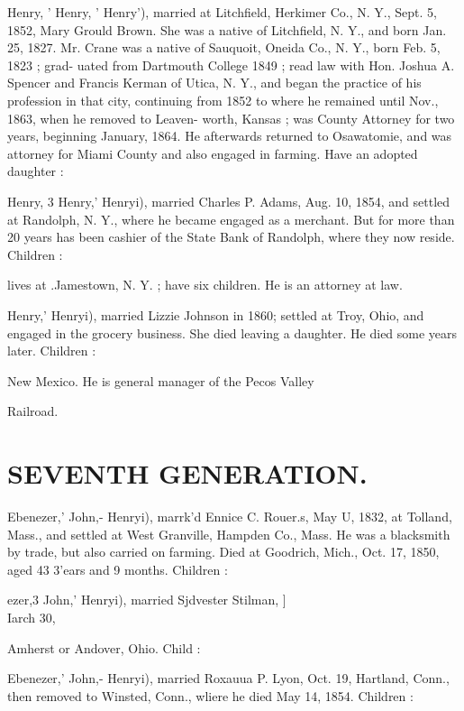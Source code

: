 \documentclass{book}
\begin{document}
Henry, ' Henry, ' Henry'), married at Litchfield, Herkimer Co., 
N. Y., Sept. 5, 1852, Mary Grould Brown. She was a native of 
Litchfield, N. Y., and born Jan. 25, 1827. Mr. Crane was a 
native of Sauquoit, Oneida Co., N. Y., born Feb. 5, 1823 ; grad- 
uated from Dartmouth College 1849 ; read law with Hon. Joshua 
A. Spencer and Francis Kerman of Utica, N. Y., and began the 
practice of his profession in that city, continuing from 1852 to 
where he remained until Nov., 1863, when he removed to Leaven- 
worth, Kansas ; was County Attorney for two years, beginning 
January, 1864. He afterwards returned to Osawatomie, and was 
attorney for Miami County and also engaged in farming. Have 
an adopted daughter : 


Henry, 3 Henry,' Henryi), married Charles P. Adams, Aug. 10, 
1854, and settled at Randolph, N. Y., where he became engaged 
as a merchant. But for more than 20 years has been cashier of 
the State Bank of Randolph, where they now reside. Children : 


lives at .Jamestown, N. Y. ; have six children. He is an 
attorney at law. 


Henry,' Henryi), married Lizzie Johnson in 1860; settled at 
Troy, Ohio, and engaged in the grocery business. She died 
leaving a daughter. He died some years later. Children : 



New Mexico. He is general manager of the Pecos Valley 

Railroad. 



\section{SEVENTH GENERATION.}


Ebenezer,' John,- Henryi), marrk'd Ennice C. Rouer.s, May U, 
1832, at Tolland, Mass., and settled at West Granville, Hampden 
Co., Mass. He was a blacksmith by trade, but also carried on 
farming. Died at Goodrich, Mich., Oct. 17, 1850, aged 43 3'ears 
and 9 months. Children : 


ezer,3 John,' Henryi), married Sjdvester Stilman, ]\\Iarch 30, 


Amherst or Andover, Ohio. Child : 


Ebenezer,' John,- Henryi), married Roxauua P. Lyon, Oct. 19, 
Hartland, Conn., then removed to Winsted, Conn., wliere he 
died May 14, 1854. Children : 
\end{document}
